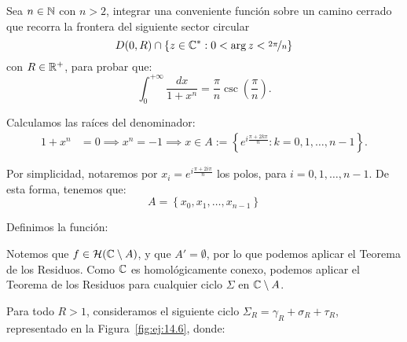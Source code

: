 \begin{ejercicio}\label{ej:14.6}
    Sea $n \in \mathbb{N}$ con $n > 2$, integrar una conveniente función sobre un camino cerrado que recorra la frontera del siguiente sector circular $$D(0,R) \cap \{z \in \mathbb{C}^* : 0 < \arg z < \nicefrac{2\pi}{n}\}$$
    con $R \in \mathbb{R}^+$, para probar que:
    \begin{equation*}
        \int_0^{+\infty} \frac{dx}{1 + x^n} = \frac{\pi}{n}\csc\left(\frac{\pi}{n}\right).
    \end{equation*}

    Calculamos las raíces del denominador:
    \begin{align*}
        1 + x^n &= 0 \implies x^n = -1 \implies x\in A:=\left\{e^{i\frac{\pi + 2k\pi}{n}} : k=0, 1, \ldots, n-1\right\}.
    \end{align*}

    Por simplicidad, notaremos por $x_i = e^{i\frac{\pi + 2i\pi}{n}}$ los polos, para $i=0, 1, \ldots, n-1$. De esta forma, tenemos que:
    \begin{equation*}
        A=\left\{x_0, x_1, \ldots, x_{n-1}\right\}
    \end{equation*}

    Definimos la función:

    Notemos que $f\in \mathcal{H}(\mathbb{C}\setminus A)$, y que $A'=\emptyset$, por lo que podemos aplicar el Teorema de los Residuos. Como $\mathbb{C}$ es homológicamente conexo, podemos aplicar el Teorema de los Residuos para cualquier ciclo $\Sigma$ en $\mathbb{C}\setminus A$.

    Para todo $R > 1$, consideramos el siguiente ciclo $\Sigma_R = \gamma_R + \sigma_R + \tau_R$, representado en la Figura~\ref{fig:ej:14.6}, donde:
    \begin{figure}
        \centering
\end{figure}
\end{ejercicio}
